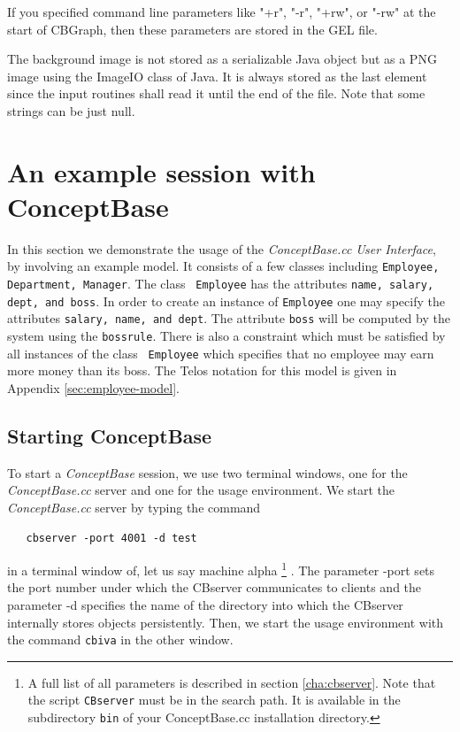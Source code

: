 If you specified command line parameters like "+r", "-r", "+rw", or "-rw" at the start of CBGraph,
then these parameters are stored in the GEL file.

The background image is not stored as a serializable Java object but as a PNG
image using the ImageIO class of Java. It is always stored as the last element since
the input routines shall read it until the end of the file.
Note that some strings can be just null.


\section{An example session with ConceptBase}
\label{sec:session}


In this section we demonstrate the usage of the {\em ConceptBase.cc User Interface}, by involving an example model. It consists of a few classes
including {\tt Employee, Department, Manager}. The class {\tt
Employee} has the attributes {\tt name, salary, dept, and boss}. In
order to create an instance of {\tt Employee} one may specify the
attributes {\tt salary, name,  and dept}. The attribute {\tt boss}
will be computed by the system using the {\tt bossrule}. There is also a
constraint which must be satisfied by all instances of the class {\tt
Employee} which specifies that no employee may earn more money than its
boss. The Telos notation for this model is given in Appendix
\ref{sec:employee-model}.


\subsection{Starting ConceptBase}


To start a {\em ConceptBase} session, we use two terminal windows, one for the {\em ConceptBase.cc}
server and one for the usage environment. We start the {\em ConceptBase.cc} server
by typing the command 
\begin{verbatim}
   cbserver -port 4001 -d test  
\end{verbatim}
in a terminal window of, let us say machine alpha%
\footnote{A full list of all parameters is described in section \ref{cha:cbserver}.
Note that the script {\tt CBserver} must be in the search path. It is available in
the subdirectory {\tt bin} of your ConceptBase.cc installation directory.}%
. The parameter -port sets the port number under which the CBserver communicates to
clients and the parameter -d specifies the name of the directory into which the 
CBserver internally stores objects persistently.
Then, we start the usage environment with
the command {\tt cbiva} in the other window. 

